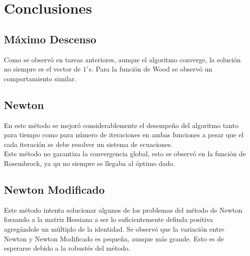 \documentclass[11pt,letterpaper]{article}
\theoremstyle{definition}
\theoremstyle{definition}
\theoremstyle{definition}
\begin{document}
\section{Conclusiones}
	\subsection{Máximo Descenso}
	Como se observó en tareas anteriores, aunque el algoritmo converge, la solución no siempre es el vector de $ 1's $. Para la función de Wood se observó un comportamiento similar.
	\subsection{Newton}
	En este método se mejoró considerablemente el desempeño del algoritmo tanto para tiempo como para número de iteraciones en ambas funciones a pesar que el cada iteración se debe resolver un sistema de ecuaciones.
	\\
	Este método no garantiza la convergencia global, esto se observó en la función de Rosembrock, ya qu no siempre se llegaba al óptimo dado. 
	\subsection{Newton Modificado}
	Este método intenta solucionar algunos de los problemas del método de Newton forzando a la matriz Hessiana a ser lo suficientemente definda positiva agregándole un múltiplo de la identidad. Se observó que la variación entre Newton y Newton Modificado es pequeña, aunque más grande. Esto es de esperarse debido a la robustés del método.
\end{document}
